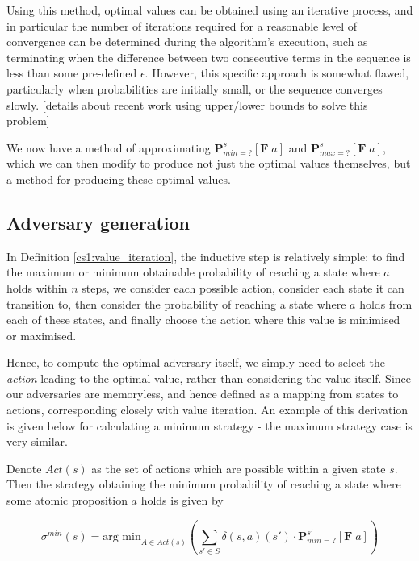 Using this method, optimal values can be obtained using an iterative process, and in particular the number of iterations required for a reasonable level of convergence can be determined during the algorithm's execution, such as terminating when the difference between two consecutive terms in the sequence is less than some pre-defined $\epsilon$. However, this specific approach is somewhat flawed, particularly when probabilities are initially small, or the sequence converges slowly. [details about recent work using upper/lower bounds to solve this problem]

We now have a method of approximating $\mathbf{P}^{s}_{min =?} [\mathbf{F} \; a]$ and $\mathbf{P}^{s}_{max =?} [\mathbf{F} \; a]$, which we can then modify to produce not just the optimal values themselves, but a method for producing these optimal values. 

\subsection{Adversary generation}
\label{cs1:adversary_gen}

In Definition \ref{cs1:value_iteration}, the inductive step is relatively simple: to find the maximum or minimum obtainable probability of reaching a state where $a$ holds within $n$ steps, we consider each possible action, consider each state it can transition to, then consider the probability of reaching a state where $a$ holds from each of these states, and finally choose the action where this value is minimised or maximised.

Hence, to compute the optimal adversary itself, we simply need to select the \emph{action} leading to the optimal value, rather than considering the value itself. Since our adversaries are memoryless, and hence defined as a mapping from states to actions, corresponding closely with value iteration. An example of this derivation is given below for calculating a minimum strategy - the maximum strategy case is very similar.

\begin{definition}
\label{cs1:min_adv_generation}

Denote $Act(s)$ as the set of actions which are possible within a given state $s$. Then the strategy obtaining the minimum probability of reaching a state where some atomic proposition $a$ holds is given by

\begin{equation*}
    \sigma^{min}(s) = \text{arg min}_{A \in Act(s)} \left( \sum_{s' \in S} \delta(s, a)(s') \cdot \mathbf{P}^{s'}_{min =?} [\mathbf{F} \; a]\right)
\end{equation*}

\end{definition}

